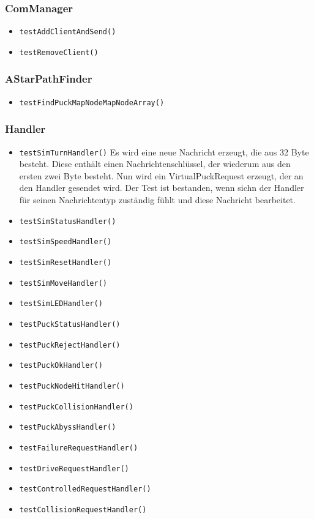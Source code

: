 \documentclass[10pt,a4paper]{article}
\begin{document}
			\subsubsection{ComManager}
			\begin{itemize}
				\item \texttt{testAddClientAndSend()}
				\item \texttt{testRemoveClient()}
			\end{itemize}
			
			\subsubsection{AStarPathFinder}
			\begin{itemize}
				\item \texttt{testFindPuckMapNodeMapNodeArray()} 
			\end{itemize}
			
			\subsubsection{Handler}
			\begin{itemize}
				\item \texttt{testSimTurnHandler()} Es wird eine neue Nachricht erzeugt, die aus 32 Byte besteht. Diese enthält einen Nachrichtenschlüssel, der wiederum aus den ersten zwei 					Byte besteht. Nun wird ein VirtualPuckRequest erzeugt, der an den Handler gesendet wird. Der Test ist bestanden, wenn sichn der Handler für seinen Nachrichtentyp zuständig 					fühlt und diese Nachricht bearbeitet.
				\item \texttt{testSimStatusHandler()}
				\item \texttt{testSimSpeedHandler()}
				\item \texttt{testSimResetHandler()}
				\item \texttt{testSimMoveHandler()}
				\item \texttt{testSimLEDHandler()}
				\item \texttt{testPuckStatusHandler()}
				\item \texttt{testPuckRejectHandler()}
				\item \texttt{testPuckOkHandler()}
				\item \texttt{testPuckNodeHitHandler()}
				\item \texttt{testPuckCollisionHandler()}
				\item \texttt{testPuckAbyssHandler()}
				\item \texttt{testFailureRequestHandler()}
				\item \texttt{testDriveRequestHandler()}
				\item \texttt{testControlledRequestHandler()}
				\item \texttt{testCollisionRequestHandler()}
			\end{itemize}
		
\end{document}
